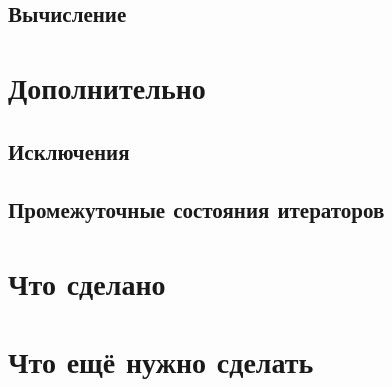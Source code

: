 \subsection{Вычисление}



\section{Дополнительно}

\subsection{Исключения}


\subsection{Промежуточные состояния итераторов}



\section{Что сделано}



\section{Что ещё нужно сделать}
